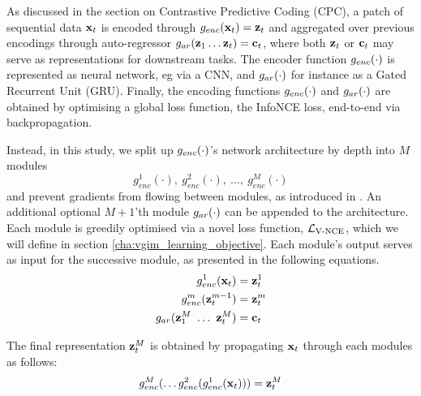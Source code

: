 		As discussed in the section on Contrastive Predictive Coding (CPC), a patch of sequential data $\mathbf{x}_t$ is encoded through $g_{enc}(\mathbf{x}_t) = \mathbf{z}_t$ and aggregated over previous encodings through auto-regressor $g_{ar}(\mathbf{z}_1  \dots \mathbf{z}_t) = \mathbf{c}_t$, where both $\mathbf{z}_t$ or $\mathbf{c}_t$ may serve as representations for downstream tasks. The encoder function $g_{enc}(\cdot)$ is represented as neural network, eg via a CNN, and $g_{ar}(\cdot)$ for instance as a Gated Recurrent Unit (GRU).
		Finally, the encoding functions $g_{enc}(\cdot)$ and $g_{ar}(\cdot)$ are obtained by optimising a global loss function, the InfoNCE loss, end-to-end via backpropagation. 

			Instead, in this study, we split up $g_{enc}(\cdot)$'s network architecture by depth into $M$ modules 
			$$g_{enc}^1(\cdot),~ g_{enc}^2(\cdot),~\dots,~g_{enc}^M(\cdot)$$ 
			and prevent gradients from flowing between modules, as introduced in \citep{lowePuttingEndEndtoEnd2020}. An additional optional $M \! + \! 1$'th module $g_{ar}(\cdot)$ can be appended to the architecture. Each module is greedily optimised via a novel loss function, $\mathcal{L}_{\text{V-NCE}}$, which we will define in section \ref{cha:vgim_learning_objective}. Each module's output serves as input for the successive module, as presented in the following equations. %
			\begin{align*} %
				g_{enc}^1(\xt) &= \zt^1 \\
				g_{enc}^m(\zt^{m-1}) &= \zt^m \\
				g_{ar}(\z_1^M ~ \dots ~ \zt^M) &= \ct
			\end{align*}
			
			The final representation $\mathbf{z}_t^M$ is obtained by propagating $\mathbf{x}_t$ through each modules as follows:
			$$ g_{enc}^M ( \dots	g_{enc}^2(g_{enc}^1(\mathbf{x}_t))) = \mathbf{z}_t^M$$
			
			
			
					
